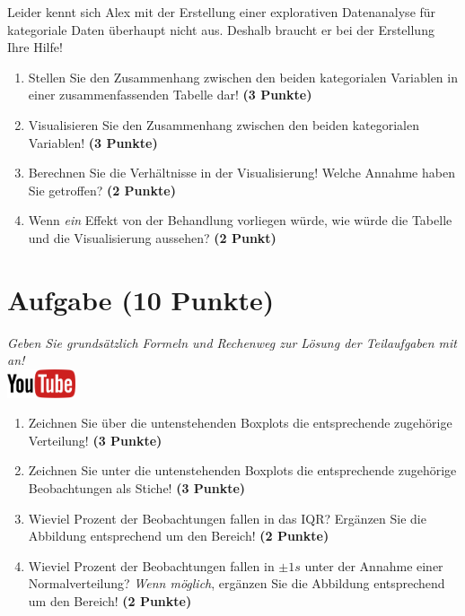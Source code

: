 \documentclass[a4paper, 9pt]{scrartcl}\usepackage[]{graphicx}\usepackage[]{xcolor}
\begin{document}
\vspace{2Ex}

Leider kennt sich Alex mit der Erstellung einer explorativen Datenanalyse für kategoriale Daten überhaupt nicht aus. Deshalb braucht er bei der Erstellung Ihre Hilfe!

\begin{enumerate}
\item Stellen Sie den Zusammenhang zwischen den beiden kategorialen Variablen in einer zusammenfassenden Tabelle dar! \textbf{(3 Punkte)}
\item Visualisieren Sie den Zusammenhang zwischen den beiden kategorialen Variablen! \textbf{(3 Punkte)}
\item Berechnen Sie die Verhältnisse in der Visualisierung! Welche Annahme haben Sie getroffen? \textbf{(2 Punkte)}
\item Wenn \textit{ein} Effekt von der Behandlung vorliegen würde, wie würde die Tabelle und die Visualisierung aussehen? \textbf{(2 Punkt)}
\end{enumerate} 
\clearpage

\section{Aufgabe \hfill (10 Punkte)}

\textit{Geben Sie grunds{\"a}tzlich Formeln und Rechenweg zur L{\"o}sung der
  Teilaufgaben mit an!} \\[1Ex]

\hfill\href{https://youtu.be/Op-gjzASH9I}{\includegraphics[width =
  2cm]{img/youtube}}\\[1Ex]



\begin{enumerate}
\item Zeichnen Sie {\"u}ber die untenstehenden Boxplots die entsprechende
  zugeh{\"o}rige Verteilung! \textbf{(3 Punkte)} 
\item Zeichnen Sie unter die untenstehenden Boxplots die entsprechende
  zugeh{\"o}rige Beobachtungen als Stiche! \textbf{(3 Punkte)}
\item Wieviel Prozent der Beobachtungen fallen in das IQR? Erg{\"a}nzen Sie die
  Abbildung entsprechend um den Bereich! \textbf{(2 Punkte)}
\item Wieviel Prozent der Beobachtungen fallen in $\pm 1s$ unter
  der Annahme einer Normalverteilung?  \textit{Wenn m{\"o}glich}, erg{\"a}nzen Sie
  die Abbildung entsprechend um den Bereich! \textbf{(2 Punkte)}
\end{enumerate}
\end{document}

